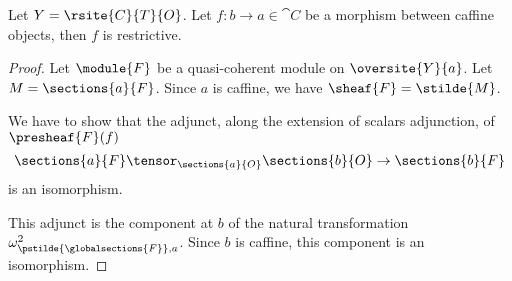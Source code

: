 \begin{theorem}
Let $Y = \rsite{C}{T}{O}$.
Let $f: b \rightarrow a \in \cat{C}$ be a morphism between caffine objects, 
then $f$ is restrictive.
\end{theorem}

\begin{proof}
Let $\module{F}$ be a quasi-coherent module on $\oversite{Y}{a}$.
Let $M = \sections{a}{F}$.
Since $a$ is caffine, we have $\sheaf{F} = \stilde{M}$.

We have to show that the adjunct, along the extension of scalars adjunction, of $\presheaf{F}(f)$
\[\sections{a}{F} \tensor_{\sections{a}{O}} \sections{b}{O} \rightarrow \sections{b}{F}\]
is an isomorphism.

This adjunct is the component at $b$ of the natural transformation $\omega^2_{\pstilde{\globalsections{F}},a}$.
Since $b$ is caffine, this component is an isomorphism.







\end{proof}
